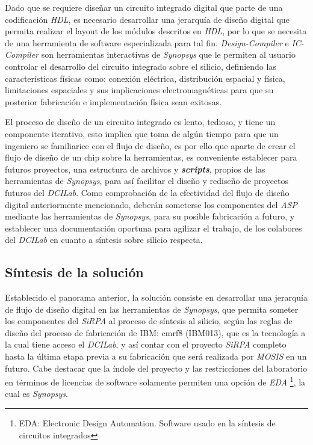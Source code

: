 Dado que se requiere diseñar un circuito integrado digital que parte de una codificación \textit{HDL}, es necesario desarrollar una jerarquía de diseño digital que permita realizar el layout de los módulos descritos en \textit{HDL}, por lo que se necesita de una herramienta de software especializada para tal fin. \textit{Design-Compiler} e \textit{IC-Compiler} son herramientas interactivas de \textit{Synopsys} que le permiten al usuario controlar el desarrollo del circuito integrado sobre el silicio, definiendo las características físicas como: conexión eléctrica, distribución espacial y física, limitaciones espaciales y sus implicaciones electromagnéticas para que su posterior fabricación e implementación física sean exitosas.

El proceso de diseño de un circuito integrado es lento, tedioso, y tiene un componente iterativo, esto implica que toma de algún tiempo para que un ingeniero se familiarice con el flujo de diseño, es por ello que aparte de crear el flujo de diseño de un chip sobre la herramientas, es conveniente establecer para futuros proyectos, una estructura de archivos y \textit{\textbf{scripts}}, propios de las herramientas de \textit{Synopsys}, para así facilitar el diseño y rediseño de proyectos futuros del \textit{DCILab}. Como comprobación de la efectividad del flujo de diseño digital anteriormente mencionado, deberán someterse los componentes del \textit{ASP} mediante las herramientas de  \textit{Synopsys}, para su posible fabricación a futuro, y establecer una documentación oportuna para agilizar el trabajo, de los colabores del \textit{DCILab} en cuanto a síntesis sobre silicio respecta.

\subsection{Síntesis de la solución}
Establecido el panorama anterior, la solución consiste en desarrollar una jerarquía de flujo de diseño digital en las herramientas de \textit{Synopsys}, que permita someter los componentes del \textit{SiRPA} al proceso de síntesis al silicio, según las reglas de diseño del proceso de fabricación de IBM: cmrf8 (IBM013), que es la tecnología a la cual
tiene acceso el \textit{DCILab}, y así contar con el proyecto \textit{SiRPA} completo hasta la última etapa previa a su fabricación que será realizada por \textit{MOSIS} en un futuro.
Cabe destacar que la índole del proyecto y las restricciones del laboratorio en términos de licencias de software solamente permiten una opción de \textit{EDA} \footnote{EDA: Electronic Design Automation. Software usado en la síntesis de circuitos integrados}, la cual es \textit{Synopsys}.

